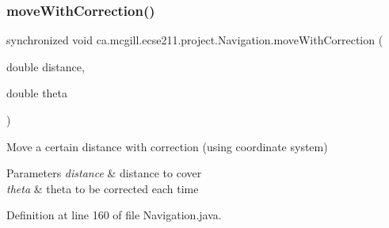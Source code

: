 \subsubsection{\texorpdfstring{move\+With\+Correction()}{moveWithCorrection()}}
{\footnotesize\ttfamily synchronized void ca.\+mcgill.\+ecse211.\+project.\+Navigation.\+move\+With\+Correction (\begin{DoxyParamCaption}\item[{double}]{distance,  }\item[{double}]{theta }\end{DoxyParamCaption})}

Move a certain distance with correction (using coordinate system)


\begin{DoxyParams}{Parameters}
{\em distance} & distance to cover \\
\hline
{\em theta} & theta to be corrected each time \\
\hline
\end{DoxyParams}


Definition at line 160 of file Navigation.\+java.


